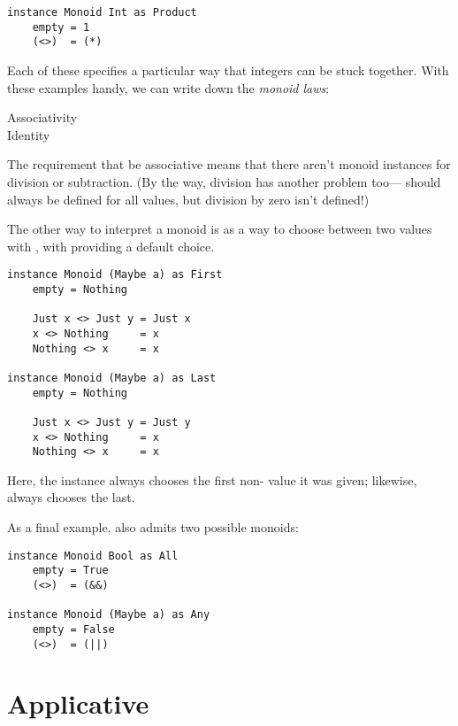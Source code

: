 \begin{lstlisting}[language=pseudoml]
instance Monoid Int as Product
    empty = 1
    (<>)  = (*)
\end{lstlisting}

Each of these specifies a particular way that integers can be stuck together. With these examples handy, we can write down the \emph{monoid laws}:

\begin{description}
    \item[Associativity] 
    \item[Identity] 
\end{description}

The requirement that \mlil{<>} be associative means that there aren't monoid instances for division or subtraction. (By the way, division has another problem too---\mlil{<>} should always be defined for all values, but division by zero isn't defined!)

The other way to interpret a monoid is as a way to choose between two values with \mlil{<>}, with  providing a default choice.

\begin{lstlisting}[language=pseudoml]
instance Monoid (Maybe a) as First
    empty = Nothing
    
    Just x <> Just y = Just x
    x <> Nothing     = x
    Nothing <> x     = x

instance Monoid (Maybe a) as Last
    empty = Nothing
    
    Just x <> Just y = Just y
    x <> Nothing     = x
    Nothing <> x     = x
\end{lstlisting}

Here, the  instance always chooses the first non- value it was given; likewise,  always chooses the last.

As a final example,  also admits two possible monoids:

\begin{lstlisting}[language=pseudoml]
instance Monoid Bool as All
    empty = True
    (<>)  = (&&)

instance Monoid (Maybe a) as Any
    empty = False
    (<>)  = (||)
\end{lstlisting}

\section{Applicative}

